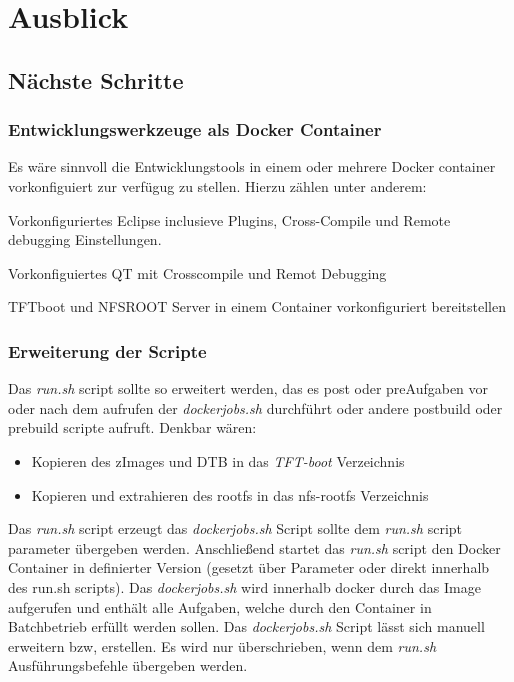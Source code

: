 
\chapter{Ausblick}%
\label{cha:ausblick}




\section{Nächste Schritte}%
\label{sec:naeste_schritte}

\subsection{Entwicklungswerkzeuge als Docker Container}%
\label{sub:developmenthost}

Es wäre sinnvoll die Entwicklungstools in einem oder mehrere Docker
container vorkonfiguiert zur verfügug zu stellen. Hierzu zählen unter anderem:

\begin{description}
    \item[Eclipse] Vorkonfiguriertes Eclipse inclusieve Plugins, Cross-Compile
        und Remote debugging Einstellungen.
    \item[QT5] Vorkonfiguiertes QT mit Crosscompile und Remot Debugging
    \item TFTboot und NFSROOT Server in einem Container vorkonfiguriert bereitstellen
\end{description}


\subsection{Erweiterung der Scripte}%
\label{sub:erweiterung_der_scripte}

Das \textit{run.sh} script sollte so erweitert werden, das es \glq post\grq
oder \glq pre\grq Aufgaben vor oder nach dem aufrufen der \textit{dockerjobs.sh}
durchführt oder andere postbuild oder prebuild scripte aufruft. Denkbar wären:

\begin{itemize}
    \item Kopieren des zImages und \ac{DTB} in das \textit{TFT-boot} Verzeichnis
    \item Kopieren und extrahieren des rootfs in das nfs-rootfs Verzeichnis
\end{itemize}


Das \textit{run.sh} script erzeugt das \textit{dockerjobs.sh} Script sollte dem
\textit{run.sh} script parameter übergeben werden. Anschließend startet das
\textit{run.sh} script den Docker Container in definierter Version
(gesetzt über Parameter oder direkt innerhalb des run.sh scripts). Das
\textit{dockerjobs.sh} wird innerhalb docker durch das Image aufgerufen und
enthält alle Aufgaben, welche durch den Container in Batchbetrieb erfüllt werden
sollen. Das \textit{dockerjobs.sh} Script lässt sich manuell erweitern bzw,
erstellen. Es wird nur überschrieben, wenn dem \textit{run.sh}
Ausführungs\-befehle übergeben werden.



